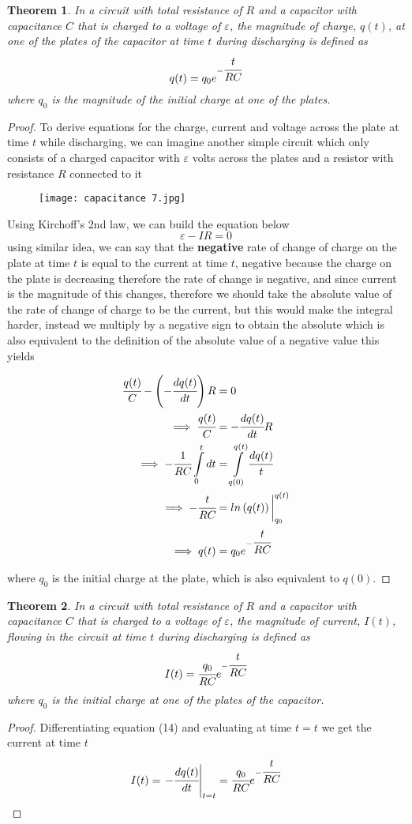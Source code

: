 \documentclass{article}
\newtheorem{theorem}{Theorem}[subsection]
\begin{document}
\begin{theorem}
In a circuit with total resistance of $R$ and a capacitor with capacitance $C$ that is charged to a voltage of $\varepsilon$, the magnitude of charge, $q(t)$, at one of the plates of the capacitor at time $t$ during discharging is defined as 
$$q(t)=q_0e^{-\cfrac{t}{RC}}$$
where $q_0$ is the magnitude of the initial charge at one of the plates.
\end{theorem}

\begin{proof}
To derive equations for the charge, current and voltage across the plate at time $t$ while discharging, we can imagine another simple circuit which only consists of a charged capacitor with $\varepsilon$ volts across the plates and a resistor with resistance $R$ connected to it 
\begin{figure}[H]
    \centering
    \texttt{[image: capacitance 7.jpg]}
\end{figure}
Using Kirchoff's 2nd law, we can build the equation below
$$\varepsilon-IR=0$$
using similar idea, we can say that the \textbf{negative} rate of change of charge on the plate at time $t$ is equal to the current at time $t$, negative because the charge on the plate is decreasing therefore the rate of change is negative, and since current is the magnitude of this changes, therefore we should take the absolute value of the rate of change of charge to be the current, but this would make the integral harder, instead we multiply by a negative sign to obtain the absolute which is also equivalent to the definition of the absolute value of a negative value
this yields

\begin{align}
    \cfrac{q(t)}{C}-\left(-\cfrac{dq(t)}{dt}\right)R&=0 \nonumber \\ \implies \cfrac{q(t)}{C}&=-\cfrac{dq(t)}{dt}R \nonumber \\\implies  -\cfrac{1}{RC}\int \limits_{0}^t dt&=\int\limits_{q(0)}^{q(t)}\cfrac{dq(t)}{t} \nonumber \\ \implies -\cfrac{t}{RC}&=ln\left(q(t)\right)\bigg|_{q_0}^{q(t)} \nonumber \\ \implies q(t)&=q_0e^{-\cfrac{t}{RC}} 
\end{align}

where $q_0$ is the initial charge at the plate, which is also equivalent to $q(0)$.
\end{proof}

\begin{theorem}
In a circuit with total resistance of $R$ and a capacitor with capacitance $C$ that is charged to a voltage of $\varepsilon$, the magnitude of current, $I(t)$, flowing in the circuit at time $t$ during discharging is defined as
$$I(t)=\cfrac{q_0}{RC}e^{-\cfrac{t}{RC}}$$
where $q_0$ is the initial charge at one of the plates of the capacitor.
\end{theorem}
\begin{proof}
Differentiating equation (14) and evaluating at time $t=t$  we get the current at time $t$
$$I(t)=\left.-\cfrac{dq(t)}{dt}\right|_{t=t}=\cfrac{q_0}{RC}e^{-\cfrac{t}{RC}}$$
\end{proof}
\end{document}
